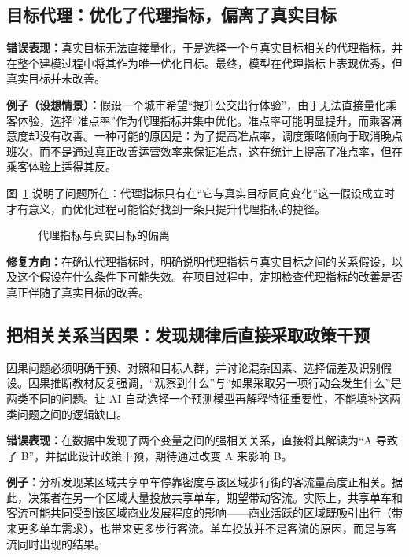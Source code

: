 \subsection{目标代理：优化了代理指标，偏离了真实目标}

\textbf{错误表现：}真实目标无法直接量化，于是选择一个与真实目标相关的代理指标，并在整个建模过程中将其作为唯一优化目标。最终，模型在代理指标上表现优秀，但真实目标并未改善。

\textbf{例子（设想情景）：}假设一个城市希望“提升公交出行体验”，由于无法直接量化乘客体验，选择“准点率”作为代理指标并集中优化。准点率可能明显提升，而乘客满意度却没有改善。一种可能的原因是：为了提高准点率，调度策略倾向于取消晚点班次，而不是通过真正改善运营效率来保证准点，这在统计上提高了准点率，但在乘客体验上适得其反。

图~\ref{fig:ch03_proxy} 说明了问题所在：代理指标只有在“它与真实目标同向变化”这一假设成立时才有意义，而优化过程可能恰好找到一条只提升代理指标的捷径。

\begin{figure}[H]
  \centering
  \caption{代理指标与真实目标的偏离}
  \label{fig:ch03_proxy}
\end{figure}

\textbf{修复方向：}在确认代理指标时，明确说明代理指标与真实目标之间的关系假设，以及这个假设在什么条件下可能失效。在项目过程中，定期检查代理指标的改善是否真正伴随了真实目标的改善。

\subsection{把相关关系当因果：发现规律后直接采取政策干预}

因果问题必须明确干预、对照和目标人群，并讨论混杂因素、选择偏差及识别假设。因果推断教材反复强调，“观察到什么”与“如果采取另一项行动会发生什么”是两类不同的问题\cite{hernan2020causal}。让 AI 自动选择一个预测模型再解释特征重要性，不能填补这两类问题之间的逻辑缺口。

\textbf{错误表现：}在数据中发现了两个变量之间的强相关关系，直接将其解读为“A 导致了 B”，并据此设计政策干预，期待通过改变 A 来影响 B。

\textbf{例子：}分析发现某区域共享单车停靠密度与该区域步行街的客流量高度正相关。据此，决策者在另一个区域大量投放共享单车，期望带动客流。实际上，共享单车和客流可能共同受到该区域商业发展程度的影响——商业活跃的区域既吸引出行（带来更多单车需求），也带来更多步行客流。单车投放并不是客流的原因，而是与客流同时出现的结果。


